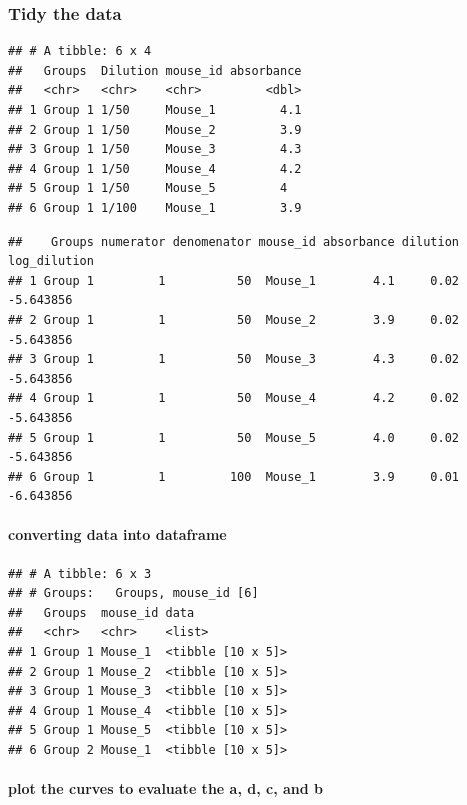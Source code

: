 \documentclass[
]{book}
\begin{document}
\subsubsection{Tidy the data}\label{tidy-the-data}

\begin{verbatim}
## # A tibble: 6 x 4
##   Groups  Dilution mouse_id absorbance
##   <chr>   <chr>    <chr>         <dbl>
## 1 Group 1 1/50     Mouse_1         4.1
## 2 Group 1 1/50     Mouse_2         3.9
## 3 Group 1 1/50     Mouse_3         4.3
## 4 Group 1 1/50     Mouse_4         4.2
## 5 Group 1 1/50     Mouse_5         4  
## 6 Group 1 1/100    Mouse_1         3.9
\end{verbatim}

\begin{verbatim}
##    Groups numerator denomenator mouse_id absorbance dilution log_dilution
## 1 Group 1         1          50  Mouse_1        4.1     0.02    -5.643856
## 2 Group 1         1          50  Mouse_2        3.9     0.02    -5.643856
## 3 Group 1         1          50  Mouse_3        4.3     0.02    -5.643856
## 4 Group 1         1          50  Mouse_4        4.2     0.02    -5.643856
## 5 Group 1         1          50  Mouse_5        4.0     0.02    -5.643856
## 6 Group 1         1         100  Mouse_1        3.9     0.01    -6.643856
\end{verbatim}

\paragraph{converting data into dataframe}\label{converting-data-into-dataframe}

\begin{verbatim}
## # A tibble: 6 x 3
## # Groups:   Groups, mouse_id [6]
##   Groups  mouse_id data             
##   <chr>   <chr>    <list>           
## 1 Group 1 Mouse_1  <tibble [10 x 5]>
## 2 Group 1 Mouse_2  <tibble [10 x 5]>
## 3 Group 1 Mouse_3  <tibble [10 x 5]>
## 4 Group 1 Mouse_4  <tibble [10 x 5]>
## 5 Group 1 Mouse_5  <tibble [10 x 5]>
## 6 Group 2 Mouse_1  <tibble [10 x 5]>
\end{verbatim}

\paragraph{plot the curves to evaluate the a, d, c, and b}\label{plot-the-curves-to-evaluate-the-a-d-c-and-b}
\end{document}
